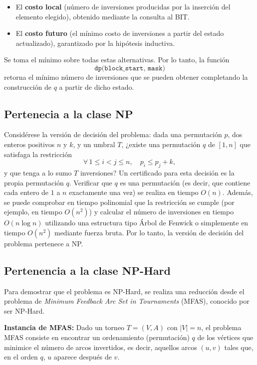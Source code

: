 ﻿\documentclass{article}
\theoremstyle{plain}
\theoremstyle{definition}
\begin{document}
\begin{itemize}
    \item El \textbf{costo local} (número de inversiones producidas por la inserción del elemento elegido), obtenido mediante la consulta al BIT.
    \item El \textbf{costo futuro} (el mínimo costo de inversiones a partir del estado actualizado), garantizado por la hipótesis inductiva.
\end{itemize}

Se toma el mínimo sobre todas estas alternativas. Por lo tanto, la función 
\[
\texttt{dp(block\_start, mask)}
\]
retorna el mínimo número de inversiones que se pueden obtener completando la construcción de $q$ a partir de dicho estado.


\subsection{Pertenecia a la clase NP}
Considérese la versión de decisión del problema: dada una permutación $p$, dos enteros positivos $n$ y $k$, y un umbral $T$, ¿existe una permutación $q$ de $[1, n]$ que satisfaga la restricción
\[
\forall\, 1 \leq i < j \leq n,\quad p_i \leq p_j + k,
\]
y que tenga a lo sumo $T$ inversiones? Un certificado para esta decisión es la propia permutación $q$. Verificar que $q$ es una permutación (es decir, que contiene cada entero de $1$ a $n$ exactamente una vez) se realiza en tiempo $O(n)$. Además, se puede comprobar en tiempo polinomial que la restricción se cumple (por ejemplo, en tiempo $O(n^2)$) y calcular el número de inversiones en tiempo $O(n \log n)$ utilizando una estructura tipo Árbol de Fenwick o simplemente en tiempo $O(n^2)$ mediante fuerza bruta. Por lo tanto, la versión de decisión del problema pertenece a NP.

\subsection{Pertenencia a la clase NP-Hard}
Para demostrar que el problema es NP-Hard, se realiza una reducción desde el problema de \emph{Minimum Feedback Arc Set in Tournaments} (MFAS), conocido por ser NP-Hard.\cite{Charbit2006TheMF}

\medskip

\textbf{Instancia de MFAS:} Dado un torneo $T=(V,A)$ con $|V|=n$, el problema MFAS consiste en encontrar un ordenamiento (permutación) $q$ de los vértices que minimice el número de arcos invertidos, es decir, aquellos arcos $(u,v)$ tales que, en el orden $q$, $u$ aparece después de $v$.
\end{document}
